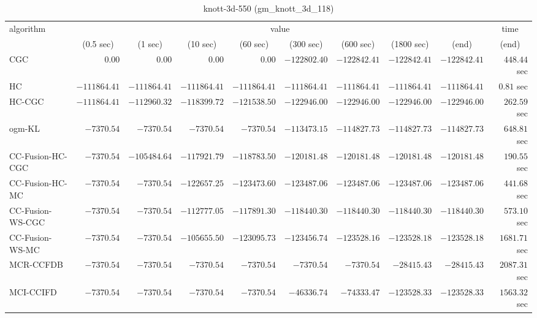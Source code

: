 \begin{table}[H]
\scriptsize
\centering
\caption{knott-3d-550 (gm\_knott\_3d\_118)}
\label{tab:anytimetable-knott-3d-550-gm-knott-3d-118}
\begin{tabular}{lrrrrrrrrr}
\toprule
           algorithm &                                   \multicolumn{8}{c}{value} & \multicolumn{1}{c}{time}   \\  
\cmidrule(lr){2-9}\cmidrule(lr){10-10}   
                     & \multicolumn{1}{c}{(0.5 sec)} & \multicolumn{1}{c}{(1 sec)} & \multicolumn{1}{c}{(10 sec)} & \multicolumn{1}{c}{(60 sec)} & \multicolumn{1}{c}{(300 sec)} & \multicolumn{1}{c}{(600 sec)} & \multicolumn{1}{c}{(1800 sec)} & \multicolumn{1}{c}{(end)} & \multicolumn{1}{c}{(end)}   \\ \midrule 
                 CGC & $         0.00$ & $         0.00$ & $         0.00$ & $         0.00$ & $   -122802.40$ & $   -122842.41$ & $   -122842.41$ & $   -122842.41$ & $       448.44$ sec   \\ 
                  HC & $   -111864.41$ & $   -111864.41$ & $   -111864.41$ & $   -111864.41$ & $   -111864.41$ & $   -111864.41$ & $   -111864.41$ & $   -111864.41$ & $         0.81$ sec   \\ 
              HC-CGC & $   -111864.41$ & $   -112960.32$ & $   -118399.72$ & $   -121538.50$ & $   -122946.00$ & $   -122946.00$ & $   -122946.00$ & $   -122946.00$ & $       262.59$ sec   \\ 
              ogm-KL & $     -7370.54$ & $     -7370.54$ & $     -7370.54$ & $     -7370.54$ & $   -113473.15$ & $   -114827.73$ & $   -114827.73$ & $   -114827.73$ & $       648.81$ sec   \\ 
    CC-Fusion-HC-CGC & $     -7370.54$ & $   -105484.64$ & $   -117921.79$ & $   -118783.50$ & $   -120181.48$ & $   -120181.48$ & $   -120181.48$ & $   -120181.48$ & $       190.55$ sec   \\ 
     CC-Fusion-HC-MC & $     -7370.54$ & $     -7370.54$ & $   -122657.25$ & $   -123473.60$ & $   -123487.06$ & $   -123487.06$ & $   -123487.06$ & $   -123487.06$ & $       441.68$ sec   \\ 
    CC-Fusion-WS-CGC & $     -7370.54$ & $     -7370.54$ & $   -112777.05$ & $   -117891.30$ & $   -118440.30$ & $   -118440.30$ & $   -118440.30$ & $   -118440.30$ & $       573.10$ sec   \\ 
     CC-Fusion-WS-MC & $     -7370.54$ & $     -7370.54$ & $   -105655.50$ & $   -123095.73$ & $   -123456.74$ & $   -123528.16$ & $   -123528.18$ & $   -123528.18$ & $      1681.71$ sec   \\ 
\cmidrule{1-1} 
           MCR-CCFDB & $     -7370.54$ & $     -7370.54$ & $     -7370.54$ & $     -7370.54$ & $     -7370.54$ & $     -7370.54$ & $    -28415.43$ & $    -28415.43$ & $      2087.31$ sec   \\ 
\cmidrule{1-1} 
           MCI-CCIFD & $     -7370.54$ & $     -7370.54$ & $     -7370.54$ & $     -7370.54$ & $    -46336.74$ & $    -74333.47$ & $   -123528.33$ & $   -123528.33$ & $      1563.32$ sec   \\ 
\bottomrule
\end{tabular}
\end{table}

